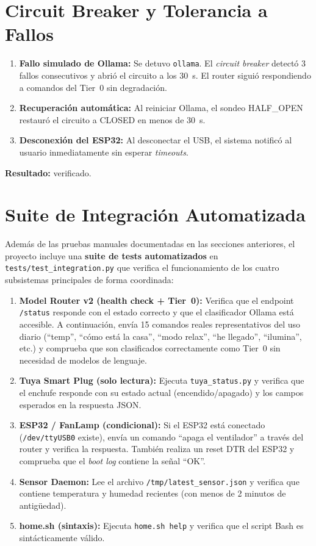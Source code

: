 \section{Circuit Breaker y Tolerancia a Fallos}
\label{sec:pruebas_circuit_breaker}

\begin{enumerate}
    \item \textbf{Fallo simulado de Ollama:} Se detuvo \texttt{ollama}. El \textit{circuit breaker} detectó 3 fallos consecutivos y abrió el circuito a los 30~s. El router siguió respondiendo a comandos del Tier~0 sin degradación.
    \item \textbf{Recuperación automática:} Al reiniciar Ollama, el sondeo HALF\_OPEN restauró el circuito a CLOSED en menos de 30~s.
    \item \textbf{Desconexión del ESP32:} Al desconectar el USB, el sistema notificó al usuario inmediatamente sin esperar \textit{timeouts}.
\end{enumerate}

\textbf{Resultado:} verificado.

\section{Suite de Integración Automatizada}
\label{sec:suite_integracion}

Además de las pruebas manuales documentadas en las secciones anteriores, el proyecto incluye una \textbf{suite de tests automatizados} en \texttt{tests/test\_integration.py} que verifica el funcionamiento de los cuatro subsistemas principales de forma coordinada:

\begin{enumerate}
    \item \textbf{Model Router v2 (health check + Tier~0):} Verifica que el endpoint \texttt{/status} responde con el estado correcto y que el clasificador Ollama está accesible. A continuación, envía 15 comandos reales representativos del uso diario (``temp'', ``cómo está la casa'', ``modo relax'', ``he llegado'', ``ilumina'', etc.) y comprueba que son clasificados correctamente como Tier~0 sin necesidad de modelos de lenguaje.
    \item \textbf{Tuya Smart Plug (solo lectura):} Ejecuta \texttt{tuya\_status.py} y verifica que el enchufe responde con su estado actual (encendido/apagado) y los campos esperados en la respuesta JSON.
    \item \textbf{ESP32 / FanLamp (condicional):} Si el ESP32 está conectado (\texttt{/dev/ttyUSB0} existe), envía un comando ``apaga el ventilador'' a través del router y verifica la respuesta. También realiza un reset DTR del ESP32 y comprueba que el \textit{boot log} contiene la señal ``OK''.
    \item \textbf{Sensor Daemon:} Lee el archivo \texttt{/tmp/latest\_sensor.json} y verifica que contiene temperatura y humedad recientes (con menos de 2 minutos de antigüedad).
    \item \textbf{home.sh (sintaxis):} Ejecuta \texttt{home.sh help} y verifica que el script Bash es sintácticamente válido.
\end{enumerate}

